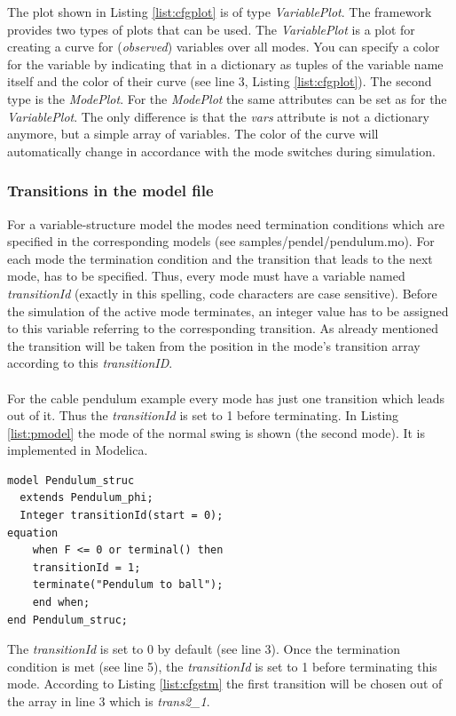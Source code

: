 The plot shown in Listing \ref{list:cfgplot} is of type \textit{VariablePlot}. The framework provides two types of plots that can be used.
The \textit{VariablePlot} is a plot for creating a curve for (\textit{observed}) variables over all modes.
You can specify a color for the variable by indicating that in a dictionary as tuples of the variable name itself and the color of their curve (see line 3, Listing \ref{list:cfgplot}).
The second type is the \textit{ModePlot}.
For the \textit{ModePlot} the same attributes can be set as for the \textit{VariablePlot}.
The only difference is that the \textit{vars} attribute is not a dictionary anymore, but a simple array of variables.
The color of the curve will automatically change in accordance with the mode switches during simulation.

 \subsubsection{Transitions in the model file}

For a variable-structure model the modes need termination conditions which are specified in the corresponding models (see samples/pendel/pendulum.mo). For each mode the termination condition and the transition that leads to the next mode, has to be specified. Thus, every mode must have a variable named \textit{transitionId} (exactly in this spelling, code characters are case sensitive). Before the simulation of the active mode terminates, an integer value has to be assigned to this variable referring to the corresponding transition. As already mentioned the transition will be taken from the position in the mode's transition array according to this \textit{transitionID}.\\
\\
For the cable pendulum example every mode has just one transition which leads out of it. Thus the \textit{transitionId} is set to 1 before terminating. In Listing \ref{list:pmodel} the mode of the normal swing is shown (the second mode). It is implemented in Modelica.
\lstset{language=modelica}
\begin{lstlisting}[frame=htrbl, caption={Pendulum Model File - pendulum.mo}, label={list:pmodel}]
model Pendulum_struc
  extends Pendulum_phi;
  Integer transitionId(start = 0);
equation 
    when F <= 0 or terminal() then
    transitionId = 1;
    terminate("Pendulum to ball");
    end when;
end Pendulum_struc;
\end{lstlisting}

 The \textit{transitionId} is set to 0 by default (see line 3). Once the termination condition is met (see line 5), the \textit{transitionId} is set to 1 before terminating this mode. According to Listing \ref{list:cfgstm} the first transition will be chosen out of the array in line 3 which is \textit{trans2\_1}.

